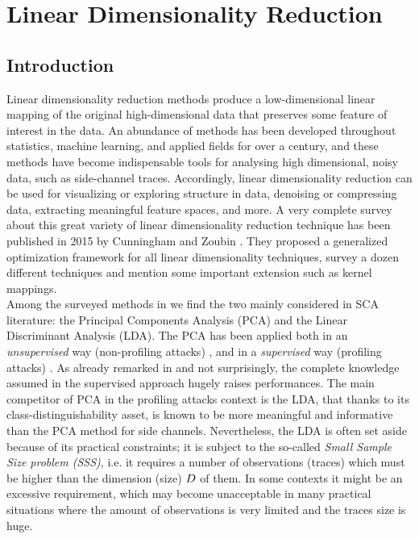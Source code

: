 
\chapter{Linear Dimensionality Reduction} %
\label{ChapterLinear}


\section{Introduction}
Linear dimensionality reduction methods produce a low-dimensional linear mapping of the original high-dimensional data that preserves some feature of interest in the data. An abundance of methods has been developed throughout statistics, machine learning, and applied fields for over a century, and these methods have become indispensable tools for analysing high dimensional, noisy data, such as side-channel traces.  Accordingly, linear dimensionality reduction can be used for visualizing or exploring structure in data, denoising or compressing data, extracting meaningful feature spaces, and more. A very complete survey about this great variety of linear dimensionality reduction technique has been published in 2015 by Cunningham and Zoubin \cite{cunningham2015linear}. They proposed a generalized optimization framework for all linear dimensionality techniques, survey a dozen different techniques and mention some important extension such as kernel mappings. \\

Among the surveyed methods in \cite{cunningham2015linear} we find the two mainly considered in SCA literature: the Principal Components Analysis (PCA) and the Linear Discriminant Analysis (LDA). The PCA has been applied both in an {\em unsupervised} way (\ie non-profiling attacks) \cite{Batina2012,karsmakers2009side}, and in a {\em supervised} way (\ie profiling attacks) \cite{TAprincipal,choudaryefficient,choudary2014efficient,disassembler,Standaert2008}. As already remarked in \cite{disassembler} and not surprisingly, the complete knowledge assumed in the supervised approach hugely raises performances. The main competitor of PCA in the profiling attacks context is the LDA, that thanks to its class-distinguishability asset, is known to be more meaningful and informative \cite{lessIsMore,Standaert2008} than the PCA method  for side channels. Nevertheless, the LDA is often set aside because of its practical constraints; it is subject to the so-called {\em Small Sample Size problem (SSS)}, i.e. it requires a number of observations (traces) which must be higher than the dimension (size) $D$ of them. In some contexts it might be an excessive requirement, which may become unacceptable in many practical situations where the amount of observations is very limited and the traces size is huge.\\

